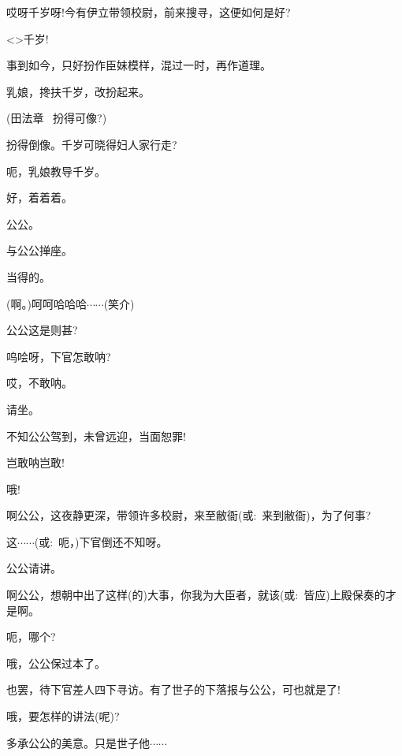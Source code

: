 {哎呀千岁呀!今有伊立带领校尉，前来搜寻，这便如何是好?

\textless{}\!\textgreater{}千岁!

事到如今，只好扮作臣妹模样，混过一时，再作道理。

乳娘，搀扶千岁，改扮起来。





(田法章\hspace{20pt}~ 扮得可像?)

扮得倒像。千岁可晓得妇人家行走?

呃，乳娘教导千岁。

好，着着着。

公公。

与公公掸座。

当得的。

(啊。)呵呵哈哈哈$\cdots{}\cdots{}$({\hwfs 笑介})

公公这是则甚?

呜哙呀，下官怎敢呐?

哎，不敢呐。

请坐。

不知公公驾到，未曾远迎，当面恕罪!

岂敢呐岂敢!

哦!

啊公公，这夜静更深，带领许多校尉，来至敝衙({\akai 或}:~来到敝衙)，为了何事?

这$\cdots{}\cdots{}$({\akai 或}:~呃，)下官倒还不知呀。

公公请讲。

啊公公，想朝中出了这样(的)大事，你我为大臣者，就该({\akai 或}:~皆应)上殿保奏的才是啊。

呃，哪个?

哦，公公保过本了。

也罢，待下官差人四下寻访。有了世子的下落报与公公，可也就是了!

哦，要怎样的讲法(呢)?

多承公公的美意。只是世子他$\cdots{}\cdots{}$

}

